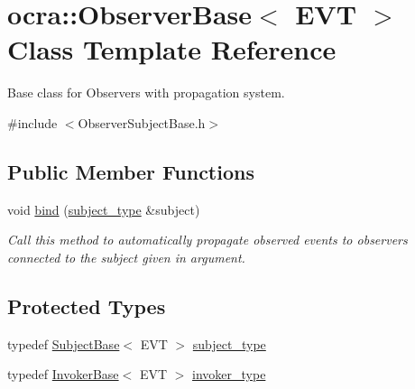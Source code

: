 \hypertarget{classocra_1_1ObserverBase}{}\section{ocra\+:\+:Observer\+Base$<$ E\+VT $>$ Class Template Reference}
\label{classocra_1_1ObserverBase}


Base class for Observers with propagation system.  




{\ttfamily \#include $<$Observer\+Subject\+Base.\+h$>$}

\subsection*{Public Member Functions}
\begin{DoxyCompactItemize}
\item 
void \hyperlink{classocra_1_1ObserverBase_ab251aaa18329dffb4389cbf417564ad6}{bind} (\hyperlink{classocra_1_1ObserverBase_a4037f8722d9842eae6f6dd5648b9ce7f}{subject\+\_\+type} \&subject)
\begin{DoxyCompactList}\small\item\em Call this method to automatically propagate observed events to observers connected to the subject given in argument. \end{DoxyCompactList}\end{DoxyCompactItemize}
\subsection*{Protected Types}
\begin{DoxyCompactItemize}
\item 
typedef \hyperlink{classocra_1_1SubjectBase}{Subject\+Base}$<$ E\+VT $>$ \hyperlink{classocra_1_1ObserverBase_a4037f8722d9842eae6f6dd5648b9ce7f}{subject\+\_\+type}
\item 
typedef \hyperlink{classocra_1_1InvokerBase}{Invoker\+Base}$<$ E\+VT $>$ \hyperlink{classocra_1_1ObserverBase_ad31fb33848323db6c887427f7dbf5c42}{invoker\+\_\+type}
\end{DoxyCompactItemize}
